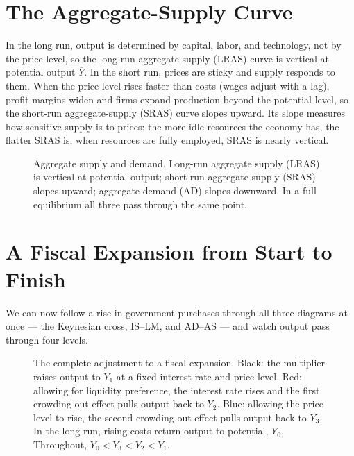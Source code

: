 
\section{The Aggregate-Supply Curve}

In the long run, output is determined by capital, labor, and technology, not by the price level, so the long-run aggregate-supply (LRAS) curve is vertical at potential output $\overline{Y}$. In the short run, prices are sticky and supply responds to them. When the price level rises faster than costs (wages adjust with a lag), profit margins widen and firms expand production beyond the potential level, so the short-run aggregate-supply (SRAS) curve slopes upward. Its slope measures how sensitive supply is to prices: the more idle resources the economy has, the flatter SRAS is; when resources are fully employed, SRAS is nearly vertical.

\begin{figure}[h]
\centering

\caption{Aggregate supply and demand. Long-run aggregate supply (LRAS) is vertical at potential output; short-run aggregate supply (SRAS) slopes upward; aggregate demand (AD) slopes downward. In a full equilibrium all three pass through the same point.}
\label{fig:macro-26}
\end{figure}


\section{A Fiscal Expansion from Start to Finish}

We can now follow a rise in government purchases through all three diagrams at once --- the Keynesian cross, IS--LM, and AD--AS --- and watch output pass through four levels.

\begin{figure}[h]
\centering

\caption{The complete adjustment to a fiscal expansion. Black: the multiplier raises output to $Y_1$ at a fixed interest rate and price level. Red: allowing for liquidity preference, the interest rate rises and the first crowding-out effect pulls output back to $Y_2$. Blue: allowing the price level to rise, the second crowding-out effect pulls output back to $Y_3$. In the long run, rising costs return output to potential, $Y_0$. Throughout, $Y_0<Y_3<Y_2<Y_1$.}
\label{fig:macro-27}
\end{figure}

